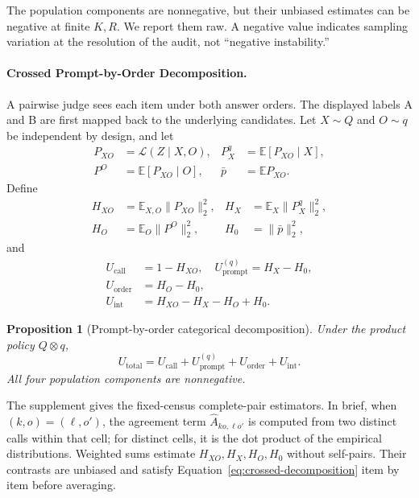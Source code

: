 \documentclass[letterpaper]{article}
\newtheorem{proposition}{Proposition}
\newcommand{\Law}{\mathcal L}
\newcommand{\E}{\mathbb E}
\newcommand{\1}{\mathbf 1}
\newcommand{\Up}{U_{\mathrm{prompt}}}
\newcommand{\Uc}{U_{\mathrm{call}}}
\newcommand{\Uo}{U_{\mathrm{order}}}
\newcommand{\Ui}{U_{\mathrm{int}}}
\newcommand{\Ut}{U_{\mathrm{total}}}
\begin{document}
The population components are nonnegative, but their unbiased estimates can
be negative at finite $K,R$. We report them raw. A negative value indicates
sampling variation at the resolution of the audit, not ``negative
instability.''

\paragraph{Crossed Prompt-by-Order Decomposition.}
A pairwise judge sees each item under both answer orders. The displayed labels A and B are first mapped back to the underlying candidates. Let $X\sim Q$ and $O\sim q$ be independent by design,
and let
\[
\begin{aligned}
P_{XO}&=\Law(Z\mid X,O),&
P_X^q&=\E[P_{XO}\mid X],\\
P^O&=\E[P_{XO}\mid O],&
\bar p&=\E P_{XO}.
\end{aligned}
\]
Define
\begin{align}
H_{XO}&=\E_{X,O}\|P_{XO}\|_2^2,
&H_X&=\E_X\|P_X^q\|_2^2,\\
H_O&=\E_O\|P^O\|_2^2,
&H_0&=\|\bar p\|_2^2,
\end{align}
and
\begin{align}
\Uc&=1-H_{XO}, \quad \Up^{(q)}=H_X-H_0,\\
\Uo&=H_O-H_0,\\
\Ui&=H_{XO}-H_X-H_O+H_0.
\end{align}

\begin{proposition}[Prompt-by-order categorical decomposition]
\label{prop:crossed}
Under the product policy $Q\otimes q$,
\begin{equation}
\Ut=\Uc+\Up^{(q)}+\Uo+\Ui.
\label{eq:crossed-decomposition}
\end{equation}
All four population components are nonnegative.
\end{proposition}

The supplement gives the fixed-census complete-pair estimators. In brief, when $(k,o)=(\ell,o')$, the agreement term
$\widehat A_{ko,\ell o'}$ is computed from two distinct calls
within that cell; for distinct cells, it is the dot product of
the empirical distributions. Weighted sums estimate $H_{XO},H_X,H_O,H_0$ without self-pairs. Their
contrasts are unbiased and satisfy Equation~\eqref{eq:crossed-decomposition}
item by item before averaging.
\end{document}
